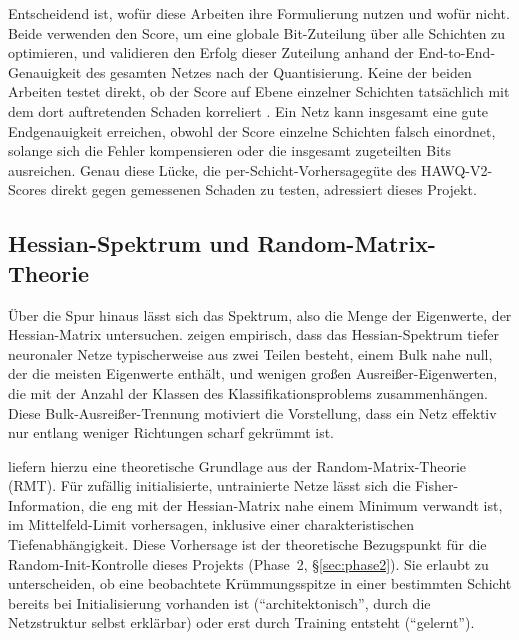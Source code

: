 Entscheidend ist, wofür diese Arbeiten ihre Formulierung nutzen und wofür nicht. Beide verwenden den Score, um eine globale Bit-Zuteilung über alle Schichten zu optimieren, und validieren den Erfolg dieser Zuteilung anhand der End-to-End-Genauigkeit des gesamten Netzes nach der Quantisierung. Keine der beiden Arbeiten testet direkt, ob der Score auf Ebene einzelner Schichten tatsächlich mit dem dort auftretenden Schaden korreliert \citep{dong_hawq_2019}. Ein Netz kann insgesamt eine gute Endgenauigkeit erreichen, obwohl der Score einzelne Schichten falsch einordnet, solange sich die Fehler kompensieren oder die insgesamt zugeteilten Bits ausreichen. Genau diese Lücke, die per-Schicht-Vorhersagegüte des HAWQ-V2-Scores direkt gegen gemessenen Schaden zu testen, adressiert dieses Projekt.

\subsection{Hessian-Spektrum und Random-Matrix-Theorie}
\label{sec:fund-rmt}

Über die Spur hinaus lässt sich das Spektrum, also die Menge der Eigenwerte, der Hessian-Matrix untersuchen. \citet{sagun_singularity_2016, sagun_empirical_2017} zeigen empirisch, dass das Hessian-Spektrum tiefer neuronaler Netze typischerweise aus zwei Teilen besteht, einem Bulk nahe null, der die meisten Eigenwerte enthält, und wenigen großen Ausreißer-Eigenwerten, die mit der Anzahl der Klassen des Klassifikationsproblems zusammenhängen. Diese Bulk-Ausreißer-Trennung motiviert die Vorstellung, dass ein Netz effektiv nur entlang weniger Richtungen scharf gekrümmt ist.
\par\medskip

\citet{karakida_fisher_2019} liefern hierzu eine theoretische Grundlage aus der Random-Matrix-Theorie (RMT). Für zufällig initialisierte, untrainierte Netze lässt sich die Fisher-Information, die eng mit der Hessian-Matrix nahe einem Minimum verwandt ist, im Mittelfeld-Limit vorhersagen, inklusive einer charakteristischen Tiefenabhängigkeit. Diese Vorhersage ist der theoretische Bezugspunkt für die Random-Init-Kontrolle dieses Projekts (Phase~2, \S\ref{sec:phase2}). Sie erlaubt zu unterscheiden, ob eine beobachtete Krümmungsspitze in einer bestimmten Schicht bereits bei Initialisierung vorhanden ist (\enquote{architektonisch}, durch die Netzstruktur selbst erklärbar) oder erst durch Training entsteht (\enquote{gelernt}).
\par\medskip

